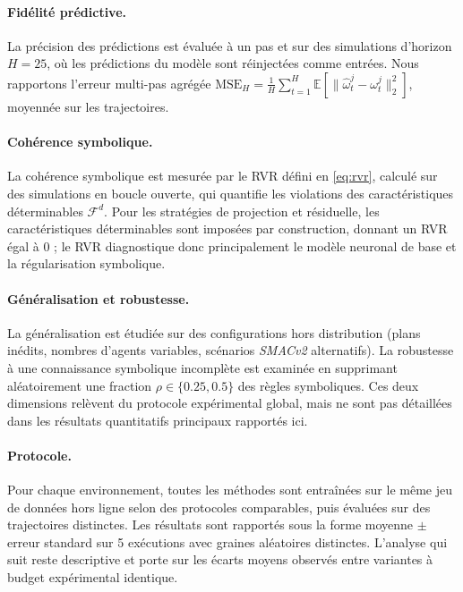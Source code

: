 \documentclass[final]{jfsma}
\theoremstyle{plain}
\theoremstyle{definition}
\theoremstyle{remark}
\begin{document}
\paragraph{Fidélité prédictive.}
La précision des prédictions est évaluée à un pas et sur des simulations d'horizon $H=25$, où les prédictions du modèle sont réinjectées comme entrées.
Nous rapportons l'erreur multi-pas agrégée
$
  \text{MSE}_H =
  \frac{1}{H}
  \sum_{t=1}^{H}
  \mathbb{E}\!\left[
    \|\hat{\omega}^j_t - \omega^j_t\|_2^2
    \right]
$,
moyennée sur les trajectoires.

\paragraph{Cohérence symbolique.}
La cohérence symbolique est mesurée par le RVR défini en \autoref{eq:rvr},
calculé sur des simulations en boucle ouverte, qui quantifie les violations des caractéristiques déterminables
$\mathcal{F}^d$.
Pour les stratégies de projection et résiduelle, les caractéristiques déterminables sont imposées
par construction, donnant un RVR égal à $0$ ; le RVR diagnostique donc principalement
le modèle neuronal de base et la régularisation symbolique.

\paragraph{Généralisation et robustesse.}
La généralisation est étudiée sur des configurations hors distribution (plans inédits, nombres d'agents variables, scénarios \emph{SMACv2} alternatifs). La robustesse à une connaissance symbolique incomplète est examinée en supprimant aléatoirement une fraction $\rho \in \{0.25, 0.5\}$ des règles symboliques. Ces deux dimensions relèvent du protocole expérimental global, mais ne sont pas détaillées dans les résultats quantitatifs principaux rapportés ici.

\paragraph{Protocole.}
Pour chaque environnement, toutes les méthodes sont entraînées sur le même jeu de données hors ligne selon des protocoles comparables, puis évaluées sur des trajectoires distinctes. Les résultats sont rapportés sous la forme moyenne $\pm$ erreur standard sur 5 exécutions avec graines aléatoires distinctes. L'analyse qui suit reste descriptive et porte sur les écarts moyens observés entre variantes à budget expérimental identique.
\end{document}
